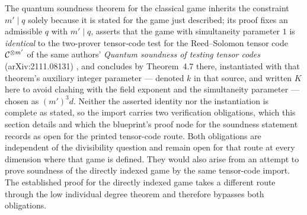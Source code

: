 \documentclass[11pt]{article}
\begin{document}
The quantum soundness theorem for the classical game inherits the constraint
$m' \mid q$ solely because it is stated for the game just described; its
proof fixes an admissible $q$ with $m' \mid q$, asserts that the game with
simultaneity parameter $1$ is \emph{identical} to the two-prover tensor-code
test for the Reed--Solomon tensor code $\mathcal C^{\otimes m'}$ of the same
authors' \emph{Quantum soundness of testing tensor codes} (arXiv:2111.08131)
\cite{Ji2021Quantum}, and concludes by Theorem~4.7 there, instantiated with
that theorem's auxiliary integer parameter --- denoted $k$ in that source,
and written $K$ here to avoid clashing with the field exponent and the
simultaneity parameter --- chosen as $(m')^3 d$.  Neither
the asserted identity nor the instantiation is complete as stated, so the
import carries two verification obligations, which this section details and
which the blueprint's proof node for the soundness statement records as
open for the printed tensor-code route. Both obligations are independent of
the divisibility question and remain open for that route at every dimension
where that game is defined.  They would also arise from an attempt to prove
soundness of the directly indexed game by the same tensor-code import.  The
established proof for the directly indexed game takes a different route through
the low individual degree theorem and therefore bypasses both obligations.
\end{document}
